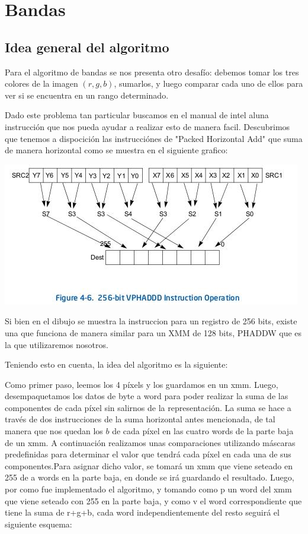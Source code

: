 \documentclass[a4paper]{article}
\begin{document}
\newpage
\section{Bandas}
\subsection{Idea general del algoritmo}
Para el algoritmo de bandas se nos presenta otro desafío: debemos tomar los tres colores de la imagen $(r,g,b)$, sumarlos, y luego comparar cada uno de ellos para ver si se encuentra en un rango determinado.

Dado este problema tan particular buscamos en el manual de intel aluna instrucción que nos pueda ayudar a realizar esto de manera facil. Descubrimos que tenemos a dispocición las instrucciónes de "Packed Horizontal Add" que suma de manera horizontal como se muestra en el siguiente grafico:

\begin{center}
\includegraphics[scale=0.66]{Dibujos/SH.jpg}
\end{center}

Si bien en el dibujo se muestra la instruccion para un registro de 256 bits, existe una que funciona de manera similar para un XMM de 128 bits, PHADDW que es la que utilizaremos nosotros.

Teniendo esto en cuenta, la idea del algoritmo es la siguiente:

Como primer paso, leemos los 4 píxels y los guardamos en un xmm. Luego, desempaquetamos los datos de byte a word para poder realizar la suma de las componentes de cada píxel sin salirnos de la representación. La suma se hace a través de dos instrucciones de la suma horizontal antes mencionada, de tal manera que nos quedan los $b$ de cada píxel en las cuatro words de la parte baja de un xmm. A continuación realizamos unas comparaciones utilizando máscaras predefinidas para determinar el valor que tendrá cada píxel en cada una de sus componentes.Para asignar dicho valor, se tomará un xmm que viene seteado en 255 de a words en la parte baja, en donde se irá guardando el resultado. Luego, por como fue implementado el algoritmo, y tomando como p un word del xmm que viene seteado con 255 en la parte baja, y como v el word correspondiente que tiene la suma de r+g+b, cada word independientemente del resto seguirá el siguiente esquema:
\end{document}
